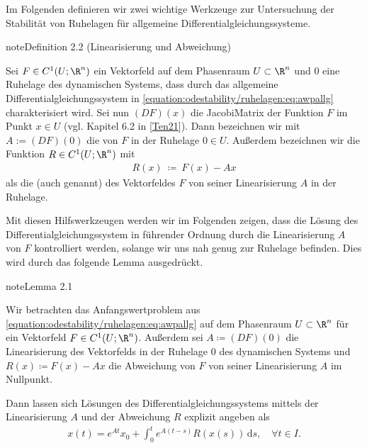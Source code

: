 \documentclass[letterpaper,10pt,german]{jupyterBook}
\begin{document}
\sphinxAtStartPar
Im Folgenden definieren wir zwei wichtige Werkzeuge zur Untersuchung der Stabilität von Ruhelagen für allgemeine Differentialgleichungssysteme.
\label{odestability/ruhelagen:def:linearisierung}
\begin{sphinxadmonition}{note}{Definition 2.2 (Linearisierung und Abweichung)}



\sphinxAtStartPar
Sei \(F\in C^1(U;\R^n)\) ein Vektorfeld auf dem Phasenraum \(U \subset \R^n\) und \(0\) eine Ruhelage des dynamischen Systems, dass durch das allgemeine Differentialgleichungssystem in \eqref{equation:odestability/ruhelagen:eq:awpallg} charakterisiert wird.
Sei nun \((DF)(x)\) die Jacobi\sphinxhyphen{}Matrix der Funktion \(F\) im Punkt \(x \in U\) (vgl. Kapitel 6.2 in {[}\hyperlink{cite.references:id15}{Ten21}{]}).
Dann bezeichnen wir mit \(A := (DF)(0)\) die  von \(F\) in der Ruhelage \(0 \in U\).
Außerdem bezeichnen wir die Funktion \(R \in C^1(U; \R^n)\) mit
\begin{equation*}
\begin{split}R(x) \ \coloneqq \ F(x) - Ax\end{split}
\end{equation*}
\sphinxAtStartPar
als die  (auch  genannt) des Vektorfeldes \(F\) von seiner Linearisierung \(A\) in der Ruhelage.
\end{sphinxadmonition}

\sphinxAtStartPar
Mit diesen Hilfswerkzeugen werden wir im Folgenden zeigen, dass die Lösung des Differentialgleichungssystem in führender Ordnung durch die Linearisierung \(A\) von \(F\) kontrolliert werden, solange wir uns nah genug zur Ruhelage befinden. Dies wird durch das folgende Lemma ausgedrückt.
\label{odestability/ruhelagen:lem:intexpglgn}
\begin{sphinxadmonition}{note}{Lemma 2.1}



\sphinxAtStartPar
Wir betrachten das Anfangswertproblem aus \eqref{equation:odestability/ruhelagen:eq:awpallg} auf dem Phasenraum \(U \subset \R^n\) für ein Vektorfeld \(F\in C^1(U;\R^n)\).
Außerdem sei \(A \coloneqq (DF)(0)\) die Linearisierung des Vektorfelds in der Ruhelage \(0\) des dynamischen Systems und \(R(x) \coloneqq F(x) - Ax\) die Abweichung von \(F\) von seiner Linearisierung \(A\) im Nullpunkt.

\sphinxAtStartPar
Dann lassen sich Lösungen des Differentialgleichungssystems mittels der Linearisierung \(A\) und der Abweichung \(R\) explizit angeben als
\begin{equation*}
\begin{split}x(t) = e^{At}x_0 + \int_0^t e^{A(t-s)} R(x(s))\, \mathrm{d}s, \quad \forall t \in I.\end{split}
\end{equation*}\end{sphinxadmonition}
\end{document}
